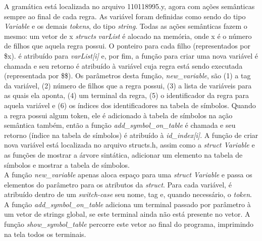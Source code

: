 \documentclass[12pt]{article}
\begin{document}
\indent A gramática está localizada no arquivo 110118995.y, agora com ações semânticas sempre ao final de cada regra. As variável foram definidas como sendo do tipo \textit{Variable} e os demais \textit{tokens}, do tipo \textit{string}. Todas as ações semânticas fazem o mesmo: um vetor de x \textit{structs} \textit{varList} é alocado na memória, onde x é o número de filhos que aquela regra possui. O ponteiro para cada filho (representados por \$x). é atribuído para \textit{varList[i] }e, por fim, a função para criar uma nova variável é chamada e seu retorno é atribuído à variável cuja regra está sendo executada (representada por \$\$). Os parâmetros desta função, \textit{new\_variable}, são (1) a tag da variável, (2) número de filhos que a regra possui, (3) a lista de variáveis para as quais ela aponta, (4) um terminal da regra, (5) o identificador da regra para aquela variável e (6) os índices dos identificadores na tabela de símbolos. Quando a regra possui algum token, ele é adicionado à tabela de símbolos na ação semântica também, então a função \textit{add\_symbol\_on\_table} é chamada e seu retorno (índice na tabela de símbolos) é atribuído à \textit{id\_index[i]}. A função de criar nova variável está localizada no arquivo structs.h, assim como a \textit{struct Variable} e as funções de mostrar a árvore sintática, adicionar um elemento na tabela de símbolos e mostrar a tabela de símbolos.  \\
\indent A função \textit{new\_variable} apenas aloca espaço para uma \textit{struct Variable} e passa os elementos do parâmetro para os atributos da \textit{struct}. Para cada variável, é atribuído dentro de um \textit{switch-case} seu nome, tag e, quando necessário, o \textit{token}. A função \textit{add\_symbol\_on\_table} adiciona um terminal passado por parâmetro à um vetor de strings global, se este terminal ainda não está presente no vetor. A função \textit{show\_symbol\_table} percorre este vetor ao final do programa, imprimindo na tela todos os terminais.
\end{document}
